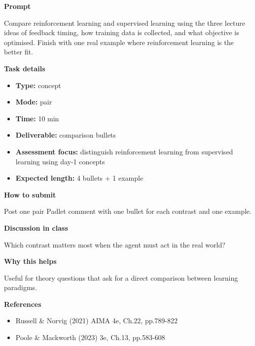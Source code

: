 \documentclass[11pt]{article}
\begin{document}
\begin{tcolorbox}[colback=white,colframe=MidnightBlue,title={Q2 Core Concept Check},fonttitle=\bfseries,breakable]
\begin{center}
\end{center}

{\large\bfseries\color{MidnightBlue} Prompt}\par\medskip
Compare reinforcement learning and supervised learning using the three lecture ideas of feedback timing, how training data is collected, and what objective is optimised. Finish with one real example where reinforcement learning is the better fit.

{\large\bfseries\color{MidnightBlue} Task details}\par\medskip
\begin{itemize}\item \textbf{Type:} concept
\item \textbf{Mode:} pair
\item \textbf{Time:} 10 min
\item \textbf{Deliverable:} comparison bullets
\item \textbf{Assessment focus:} distinguish reinforcement learning from supervised learning using day-1 concepts
\item \textbf{Expected length:} 4 bullets + 1 example\end{itemize}

{\large\bfseries\color{MidnightBlue} How to submit}\par\medskip
Post one pair Padlet comment with one bullet for each contrast and one example.

{\large\bfseries\color{MidnightBlue} Discussion in class}\par\medskip
Which contrast matters most when the agent must act in the real world?

{\large\bfseries\color{MidnightBlue} Why this helps}\par\medskip
Useful for theory questions that ask for a direct comparison between learning paradigms.

{\large\bfseries\color{MidnightBlue} References}\par\medskip
\begin{itemize}\item Russell \& Norvig (2021) AIMA 4e, Ch.22, pp.789-822
\item Poole \& Mackworth (2023) 3e, Ch.13, pp.583-608\end{itemize}
\end{tcolorbox}
\end{document}
